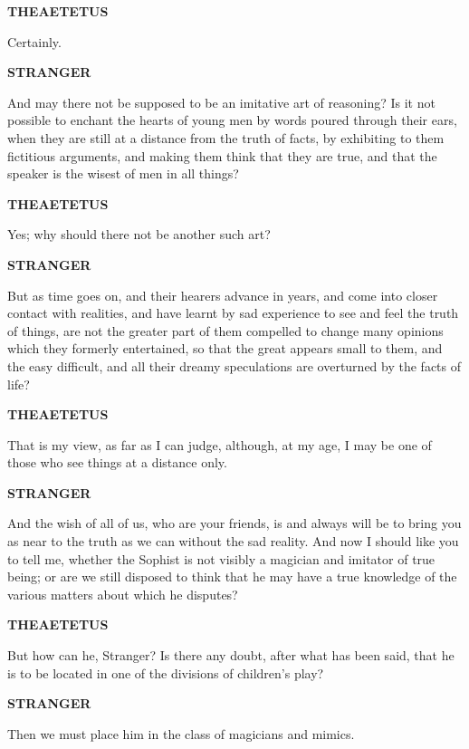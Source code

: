 \documentclass[11pt,letter]{article}
\begin{document}
\par \textbf{THEAETETUS}
\par   Certainly.

\par \textbf{STRANGER}
\par   And may there not be supposed to be an imitative art of reasoning? Is it not possible to enchant the hearts of young men by words poured through their ears, when they are still at a distance from the truth of facts, by exhibiting to them fictitious arguments, and making them think that they are true, and that the speaker is the wisest of men in all things?

\par \textbf{THEAETETUS}
\par   Yes; why should there not be another such art?

\par \textbf{STRANGER}
\par   But as time goes on, and their hearers advance in years, and come into closer contact with realities, and have learnt by sad experience to see and feel the truth of things, are not the greater part of them compelled to change many opinions which they formerly entertained, so that the great appears small to them, and the easy difficult, and all their dreamy speculations are overturned by the facts of life?

\par \textbf{THEAETETUS}
\par   That is my view, as far as I can judge, although, at my age, I may be one of those who see things at a distance only.

\par \textbf{STRANGER}
\par   And the wish of all of us, who are your friends, is and always will be to bring you as near to the truth as we can without the sad reality. And now I should like you to tell me, whether the Sophist is not visibly a magician and imitator of true being; or are we still disposed to think that he may have a true knowledge of the various matters about which he disputes?

\par \textbf{THEAETETUS}
\par   But how can he, Stranger? Is there any doubt, after what has been said, that he is to be located in one of the divisions of children's play?

\par \textbf{STRANGER}
\par   Then we must place him in the class of magicians and mimics.
\end{document}
